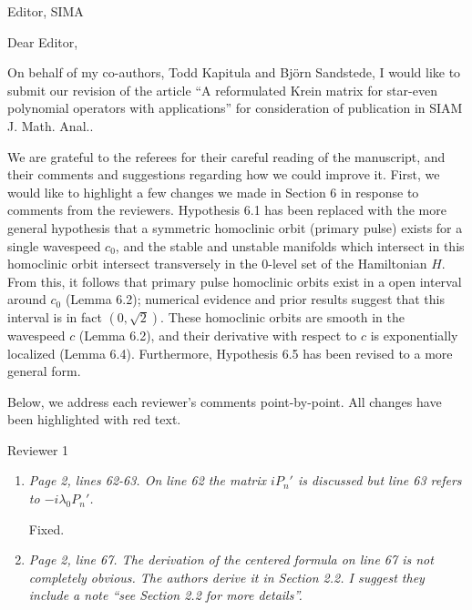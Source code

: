 \documentclass[11pt]{letter}
\begin{document}
\address{Ross Parker \\
Division of Applied Mathematics \\
Brown University \\
Providence, RI 02912 \\
\texttt{ross\_parker@brown.edu}}%
\signature{Ross Parker}
\begin{letter}{Editor, SIMA}

\opening{Dear Editor,}

On behalf of my co-authors, Todd Kapitula and Bj\"orn Sandstede, I would like to submit our revision of the article ``A reformulated Krein matrix for star-even polynomial operators with applications'' for consideration of publication in SIAM J. Math. Anal..

We are grateful to the referees for their careful reading of the manuscript, and their comments and suggestions regarding how we could improve it. First, we would like to highlight a few changes we made in Section 6 in response to comments from the reviewers. Hypothesis 6.1 has been replaced with the more general hypothesis that a symmetric homoclinic orbit (primary pulse) exists for a single wavespeed $c_0$, and the stable and unstable manifolds which intersect in this homoclinic orbit intersect transversely in the 0-level set of the Hamiltonian $H$. From this, it follows that primary pulse homoclinic orbits exist in a open interval around $c_0$ (Lemma 6.2); numerical evidence and prior results suggest that this interval is in fact $(0, \sqrt{2})$. These homoclinic orbits are smooth in the wavespeed $c$ (Lemma 6.2), and their derivative with respect to $c$ is exponentially localized (Lemma 6.4). Furthermore, Hypothesis 6.5 has been revised to a more general form.

Below, we address each reviewer's comments point-by-point. All changes have been highlighted with red text.

Reviewer 1
\begin{enumerate}

\item \emph{Page 2, lines 62-63. On line 62 the matrix $iP_n'$ is discussed but line 63 refers to $-i\lambda_0 P_n'$.}
\vspace{4mm}

Fixed.

\item \emph{Page 2, line 67. The derivation of the centered formula on line 67 is not completely obvious. The authors derive it in Section 2.2. I suggest they include a note ``see Section 2.2 for more details''.}
\vspace{4mm}


\end{enumerate}
\end{letter}
\end{document}
